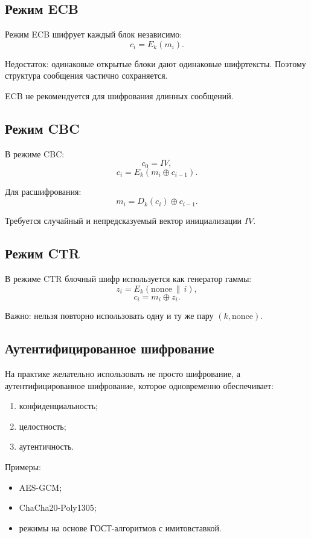\documentclass[12pt,a4paper]{article}
\begin{document}
\subsection{Режим ECB}

Режим ECB шифрует каждый блок независимо:
\[
    c_i=E_k(m_i).
\]

Недостаток: одинаковые открытые блоки дают одинаковые шифртексты. Поэтому структура сообщения частично сохраняется.

ECB не рекомендуется для шифрования длинных сообщений.

\subsection{Режим CBC}

В режиме CBC:
\[
    c_0=IV,
\]
\[
    c_i=E_k(m_i\oplus c_{i-1}).
\]

Для расшифрования:
\[
    m_i=D_k(c_i)\oplus c_{i-1}.
\]

Требуется случайный и непредсказуемый вектор инициализации $IV$.

\subsection{Режим CTR}

В режиме CTR блочный шифр используется как генератор гаммы:
\[
    z_i=E_k(\text{nonce}\,\|\,i),
\]
\[
    c_i=m_i\oplus z_i.
\]

Важно: нельзя повторно использовать одну и ту же пару $(k,\text{nonce})$.

\subsection{Аутентифицированное шифрование}

На практике желательно использовать не просто шифрование, а аутентифицированное шифрование, которое одновременно обеспечивает:

\begin{enumerate}
    \item конфиденциальность;
    \item целостность;
    \item аутентичность.
\end{enumerate}

Примеры:
\begin{itemize}
    \item AES-GCM;
    \item ChaCha20-Poly1305;
    \item режимы на основе ГОСТ-алгоритмов с имитовставкой.
\end{itemize}
\end{document}
